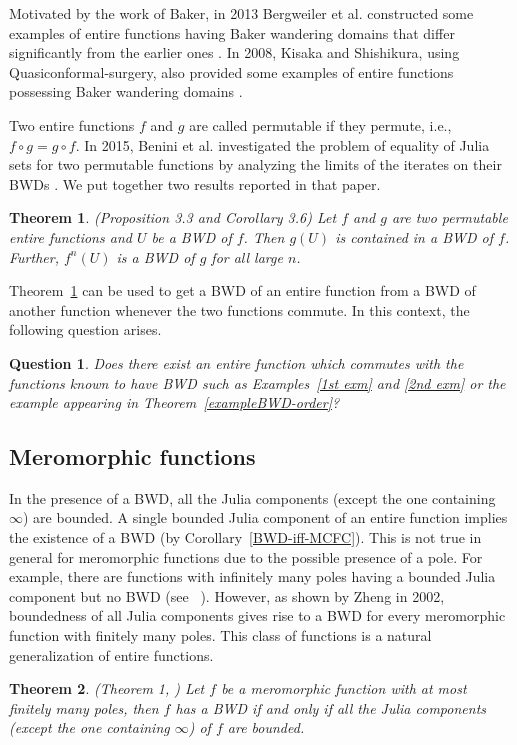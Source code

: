 \documentclass[11pt,a4paper]{article}
\newtheorem{theorem}{Theorem}[section]
\newtheorem{Question}{Question}
\begin{document}
	Motivated by the work of Baker, in 2013 Bergweiler et al. constructed some  examples of entire functions having Baker wandering domains that differ significantly from the earlier ones  \cite{BergRippStall 2013}. In 2008, Kisaka and Shishikura, using Quasiconformal-surgery, also provided some examples of entire functions possessing Baker wandering domains \cite{KisakaShishikura 2008}.
	\par Two entire functions $f$ and $g$ are called permutable if they permute, i.e., $f\circ g=g\circ f$. In 2015, Benini et al. investigated the problem of equality of Julia sets for two permutable functions by analyzing the limits of the iterates  on their BWDs \cite{Benini rippon Stallard 2015}. We put together two results reported in that paper.
	
	\begin{theorem} (Proposition 3.3 and Corollary 3.6)
		Let $f$ and $g$ are two permutable entire functions and $U$ be a BWD of $f$. Then $g(U)$ is contained in a BWD of $f$. Further,  $f^n(U)$ is a BWD of   $g$ for all large $n$.
		\label{Benini-BWD}	\end{theorem}
	Theorem~\ref{Benini-BWD} can be used to get a BWD of an entire function from a BWD of another function whenever the two functions commute. In this context, the following question arises.	
	\begin{Question}
		Does there exist an entire function which commutes with the functions known to have BWD such as Examples~\ref{1st exm} and \ref{2nd exm} or the example appearing in Theorem~\ref{exampleBWD-order}?
	\end{Question}
	\subsection{Meromorphic functions}  \label{meromorphic}
	In the presence of a BWD, all the Julia components (except the one containing $\infty$) are bounded. 
 A single bounded Julia component of an entire function implies the existence of a BWD  (by Corollary~\ref{BWD-iff-MCFC}). This is not  true in general for meromorphic functions due to the possible presence of a pole. For example, there are functions with infinitely many poles having a bounded Julia component but no BWD (see ~\cite{NayakZheng 2011}). However, as shown by Zheng in 2002, boundedness of all Julia components gives rise to a BWD for every meromorphic function with finitely many poles. This class of functions is a natural generalization of entire functions.  
	\begin{theorem}(Theorem 1, \cite{Zheng 2002})
		Let $f$ be a meromorphic function with at most finitely many poles, then $f$ has a BWD if and only if all the Julia components (except the one containing $\infty$) of $f$ are bounded.
		\label{FP-BWD-IFF}
	\end{theorem}
	
\end{document}
